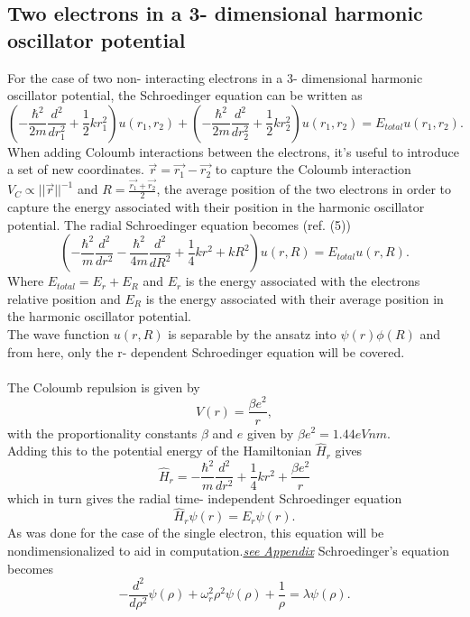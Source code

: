 \documentclass[10pt,a4paper]{article}
\begin{document}
\subsection{Two electrons in a 3- dimensional harmonic oscillator potential}
For the case of two non- interacting electrons in a 3- dimensional harmonic oscillator potential, the Schroedinger equation can be written as 
\begin{equation*}
\left(-\frac{\hbar^2}{2 m} \frac{d^2}{dr_1^2}+ \frac{1}{2}k r_1^2\right)u(r_1,r_2)+\left( -\frac{\hbar^2}{2 m} \frac{d^2}{dr_2^2}+ \frac{1}{2}k r_2^2\right)u(r_1,r_2)  = E_{total} u(r_1,r_2).
\end{equation*}
When adding Coloumb interactions between the electrons, it's useful to introduce a set of new coordinates. $\vec{r}=\vec{r_1}-\vec{r_2}$ to capture the Coloumb interaction $V_C \propto ||\vec{r}||^{-1}$ and $R = \frac{\vec{r_1}+\vec{r_2}}{2}$, the average position of the two electrons in order to capture the energy associated with their position in the harmonic oscillator potential. The radial Schroedinger equation becomes (ref. (5))
\begin{equation*}
\left(  -\frac{\hbar^2}{m} \frac{d^2}{dr^2} -\frac{\hbar^2}{4 m} \frac{d^2}{dR^2}+ \frac{1}{4} k r^2+  kR^2\right)u(r,R)  = E_{total} u(r,R).
\end{equation*}
Where $E_{total} = E_r+E_R$ and $E_r$ is the energy associated with the electrons relative position and $E_R$ is the energy associated with their average position in the harmonic oscillator potential.\\The wave function $u(r,R)$ is separable by the ansatz into $\psi(r)\phi(R)$ and from here, only the r- dependent Schroedinger equation will be covered.\\\\The Coloumb repulsion is given by
\begin{equation*}
V(r)=\frac{\beta e^2}{r},
\end{equation*}
with the proportionality constants $\beta$ and $e$ given by $\beta e^2 = 1.44 eVnm$.\\Adding this to the potential energy of the Hamiltonian $\hat{H}_r$ gives
\begin{equation*}
\hat{H}_r= -\frac{\hbar^2}{m} \frac{d^2}{dr^2}+ \frac{1}{4}k r^2+\frac{\beta e^2}{r}
\end{equation*}
which in turn gives the radial time- independent Schroedinger equation
\begin{equation*}
\hat{H}_r \psi(r)=E_r\psi(r).
\end{equation*}
As was done for the case of the single electron, this equation will be nondimensionalized to aid in computation.\hyperref[nondim_2_el]{\emph{see Appendix}}
Schroedinger's equation becomes
\begin{equation*}
  -\frac{d^2}{d\rho^2} \psi(\rho) + \omega_r^2\rho^2\psi(\rho) +\frac{1}{\rho} = \lambda \psi(\rho).
\end{equation*}
\end{document}
